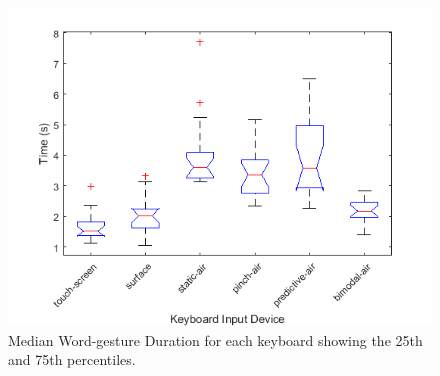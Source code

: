 \begin{figure}[t]
	\centering
	\includegraphics{Figures/fig_time_boxplot}
	\caption[Word-gesture Duration Boxplot]{Median Word-gesture Duration for each keyboard showing the 25th and 75th percentiles.}
	\label{fig_time_boxplot}
\end{figure}

